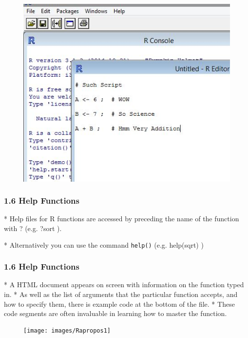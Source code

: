     
 
 \begin{figure}
 \centering
 \includegraphics[width=0.7\linewidth]{images/Rscript}         
 \end{figure}
    
 
 
 \frametitle{1.6 Help Functions}
 
*  Help files for R functions are accessed by preceding the name of the function with ? (e.g. ?sort
 ). 
 
*  Alternatively you can use the command \texttt{help()} (e.g. help(sqrt) )

 
 
 
 
 \frametitle{1.6 Help Functions}
 
*  A HTML document appears on screen with information on the function typed in. 
*  As well
 as the list of arguments that the particular function accepts, and how to specify them, there is
 example code at the bottom of the file. 
*  These code segments are often invaluable in learning
 how to master the function.

 
 
 
 
 
 
 \begin{figure}
 \centering
 \texttt{[image: images/Rapropos1]}       
 \end{figure}
    

